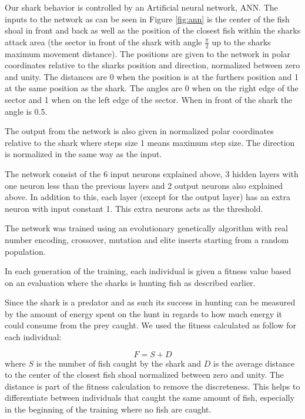 Our shark behavior is controlled by an Artificial neural network, ANN. The inputs to the network as can be seen in Figure \ref{fig:ann} is the center of the fish shoal in front and back as well as the position of the closest fish within the sharks attack area (the sector in front of the shark with angle $\frac{\pi}{2}$ up to the sharks maximum movement distance). The positions are given to the network in polar coordinates relative to the sharks position and direction, normalized between zero and unity. The distances are 0 when the position is at the furthers position and 1 at the same position as the shark. The angles are 0 when on the right edge of the sector and 1 when on the left edge of the sector. When in front of the shark the angle is 0.5.

The output from the network is also given in normalized polar coordinates relative to the shark where steps size 1 means maximum step size. The direction is normalized in the same way as the input.

The network consist of the 6 input neurons explained above, 3 hidden layers with one neuron less than the previous layers and 2 output neurons also explained above. In addition to this, each layer (except for the output layer) has an extra neuron with input constant 1. This extra neurons acts as the threshold.

The network was trained using an evolutionary genetically algorithm with real number encoding, crossover, mutation and elite inserts starting from a random population.

In each generation of the training, each individual is given a fitness value based on an evaluation where the sharks is hunting fish as described earlier.

Since the shark is a predator and as such its success in hunting can be measured by the amount of energy spent on the hunt in regards to how much energy it could consume from the prey caught. We used the fitness calculated as follow for each individual:

\begin{equation}
  F = S+D\label{eq:fitness}
\end{equation}
where $S$ is the number of fish caught by the shark and $D$ is the average distance to the center of the closest fish shoal normalized between zero and unity. The distance is part of the fitness calculation to remove the discreteness. This helps to differentiate between individuals that caught the same amount of fish, especially in the beginning of the training where no fish are caught.


